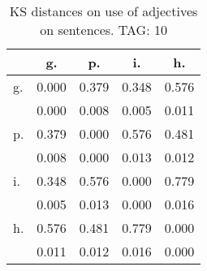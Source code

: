 \begin{table}[h!]
\begin{center}
\begin{tabular}{| l | c | c | c | c |}\hline
 & g. & p. & i. & h. \\\hline
g. & 0.000  & 0.379  & 0.348  & 0.576 \\\hline
 & 0.000  & 0.008  & 0.005  & 0.011 \\\hline
p. & 0.379  & 0.000  & 0.576  & 0.481 \\\hline
 & 0.008  & 0.000  & 0.013  & 0.012 \\\hline
i. & 0.348  & 0.576  & 0.000  & 0.779 \\\hline
 & 0.005  & 0.013  & 0.000  & 0.016 \\\hline
h. & 0.576  & 0.481  & 0.779  & 0.000 \\\hline
 & 0.011  & 0.012  & 0.016  & 0.000 \\\hline
\end{tabular}
\caption{KS distances on use of adjectives on sentences. TAG: 10}
\end{center}
\end{table}